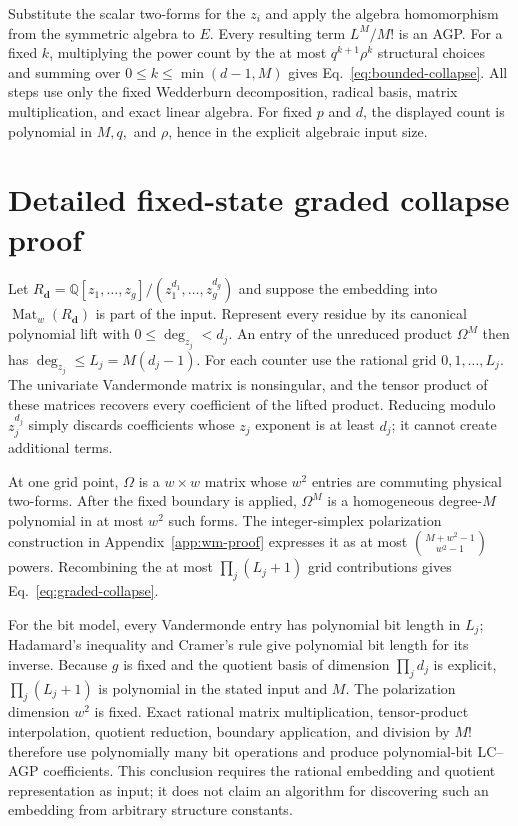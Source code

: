 \documentclass[11pt]{article}
\theoremstyle{definition}
\newcommand{\Mat}{\operatorname{Mat}}
\begin{document}
Substitute the scalar two-forms for the $z_i$ and apply the algebra homomorphism
from the symmetric algebra to $E$.  Every resulting term $L^M/M!$ is an AGP.
For a fixed $k$, multiplying the power count by the at most
$q^{k+1}\rho^k$ structural choices and summing over
$0\le k\le\min(d-1,M)$ gives Eq.~\eqref{eq:bounded-collapse}.  All steps use
only the fixed Wedderburn decomposition, radical basis, matrix multiplication,
and exact linear algebra.  For fixed $p$ and $d$, the displayed count is
polynomial in $M,q,$ and $\rho$, hence in the explicit algebraic input size.

\section{Detailed fixed-state graded collapse proof}
\label{app:graded-proof}

Let
$R_{\boldsymbol d}=\mathbb Q[z_1,\ldots,z_g]/
(z_1^{d_1},\ldots,z_g^{d_g})$ and suppose the embedding into
$\Mat_w(R_{\boldsymbol d})$ is part of the input.  Represent every residue by
its canonical polynomial lift with $0\le\deg_{z_j}<d_j$.  An entry of the
unreduced product $\Omega^M$ then has
$\deg_{z_j}\le L_j=M(d_j-1)$.  For each counter use the rational grid
$0,1,\ldots,L_j$.  The univariate Vandermonde matrix is nonsingular, and the
tensor product of these matrices recovers every coefficient of the lifted
product.  Reducing modulo $z_j^{d_j}$ simply discards coefficients whose
$z_j$ exponent is at least $d_j$; it cannot create additional terms.

At one grid point, $\Omega$ is a $w\times w$ matrix whose $w^2$ entries are
commuting physical two-forms.  After the fixed boundary is applied,
$\Omega^M$ is a homogeneous degree-$M$ polynomial in at most $w^2$ such forms.
The integer-simplex polarization construction in
Appendix~\ref{app:wm-proof} expresses it as at most
$\binom{M+w^2-1}{w^2-1}$ powers.  Recombining the at most
$\prod_j(L_j+1)$ grid contributions gives Eq.~\eqref{eq:graded-collapse}.

For the bit model, every Vandermonde entry has polynomial bit length in $L_j$;
Hadamard's inequality and Cramer's rule give polynomial bit length for its
inverse.  Because $g$ is fixed and the quotient basis of dimension
$\prod_jd_j$ is explicit, $\prod_j(L_j+1)$ is polynomial in the stated input
and $M$.  The polarization dimension $w^2$ is fixed.  Exact rational matrix
multiplication, tensor-product interpolation, quotient reduction, boundary
application, and division by $M!$ therefore use polynomially many bit
operations and produce polynomial-bit LC--AGP coefficients.  This conclusion
requires the rational embedding and quotient representation as input; it does
not claim an algorithm for discovering such an embedding from arbitrary
structure constants.

\begingroup
\small


\endgroup
\end{document}
